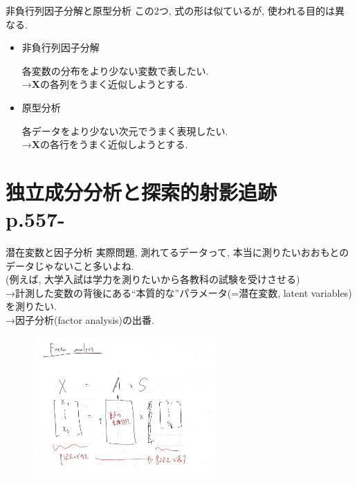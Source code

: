 \documentclass[dvipdfmx,8pt]{beamer}
\begin{document}
  \begin{frame}{非負行列因子分解と原型分析}
    この2つ, 式の形は似ているが, 使われる目的は異なる.
    \begin{itemize}
      \item 非負行列因子分解

        各変数の分布をより少ない変数で表したい. \\
        →$\mathbf{X}$の各列をうまく近似しようとする.

      \item 原型分析

        各データをより少ない次元でうまく表現したい. \\
        →$\mathbf{X}$の各行をうまく近似しようとする.
    \end{itemize}
  \end{frame}
  \section{独立成分分析と探索的射影追跡\\p.557-}
  \begin{frame}{潜在変数と因子分析}
    実際問題, 測れてるデータって, 本当に測りたいおおもとのデータじゃないこと多いよね. \\
    (例えば, 大学入試は学力を測りたいから各教科の試験を受けさせる)\\
    →計測した変数の背後にある``本質的な''パラメータ(=潜在変数, latent variables)を測りたい. \\
    →因子分析(factor analysis)の出番.
    \begin{figure}[htb]
      \centering
      \includegraphics[width=7cm,clip]{images/fa-overview.jpg}
    \end{figure}
  \end{frame}
\end{document}
